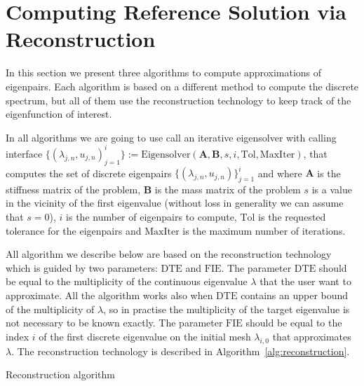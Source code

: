 \documentclass[preprint ,12pt]{elsarticle}
\begin{document}
\section{Computing Reference Solution via Reconstruction}

In this section we present three algorithms to compute approximations of eigenpairs. Each algorithm is based on a different method to compute the discrete spectrum, but all of them use the reconstruction technology to keep track of the eigenfunction of interest.

In all algorithms we are going to use call an iterative eigensolver with calling interface
$\{(\lambda_{j,n},u_{j,n})_{j=1}^{i}\}:=\mathrm{Eigensolver}(\mathbf{A},\mathbf{B},s,i,\mathrm{Tol},\mathrm{MaxIter})$, that computes the set of discrete eigenpairs $\{(\lambda_{j,n},u_{j,n})\}_{j=1}^{i}$ and where $\mathbf{A}$ is the stiffness matrix of the problem, $\mathbf{B}$ is the mass matrix of the problem $s$ is a value in the vicinity of the first eigenvalue (without loss in generality we can assume that $s=0$), $i$ is the number of eigenpairs to compute, $\mathrm{Tol}$ is the requested tolerance for the eigenpairs and $\mathrm{MaxIter}$ is the maximum number of iterations. 


All algorithm we describe below are based on the reconstruction technology which is guided by two parameters: $\mathrm{DTE}$ and $\mathrm{FIE}$. The parameter $\mathrm{DTE}$ should be equal to the multiplicity of the continuous eigenvalue $\lambda$ that the user want to approximate. All the algorithm works also when $\mathrm{DTE}$ contains an upper bound of the multiplicity of $\lambda$, so in practise the multiplicity of the target eigenvalue is not necessary to be known exactly. The parameter $\mathrm{FIE}$ should be equal to the index $i$ of the first discrete eigenvalue on the initial mesh $\lambda_{i,0}$ that approximates $\lambda$. The reconstruction technology is described in Algorithm~\eqref{alg:reconstruction}.

\begin{algorithm}[H] \caption{Reconstruction algorithm} \label{alg:reconstruction} 
\begin{algorithmic}




\end{algorithmic}
\end{algorithm}
\end{document}

